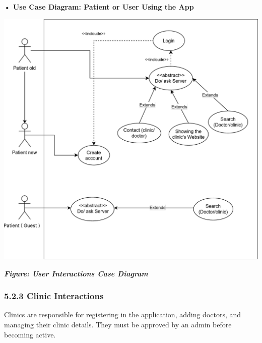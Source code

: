 \documentclass[12pt]{report}
\begin{document}
\vspace{0.5cm}
\noindent \textbf{• Use Case Diagram: Patient or User Using the App}
\vspace{0.6cm}
\begin{center}
	\includegraphics[width=\textwidth]{images/patientCas.pdf} %
\end{center}
\vspace{-0.35cm}
\begin{center}
	\textit{\textbf{Figure: User Interactions Case Diagram}}
\end{center}
\newpage
\subsubsection*{\textbf{5.2.3 Clinic Interactions}}
Clinics are responsible for registering in the application, adding doctors, and managing their clinic details. They must be approved by an admin before becoming active.
\end{document}
